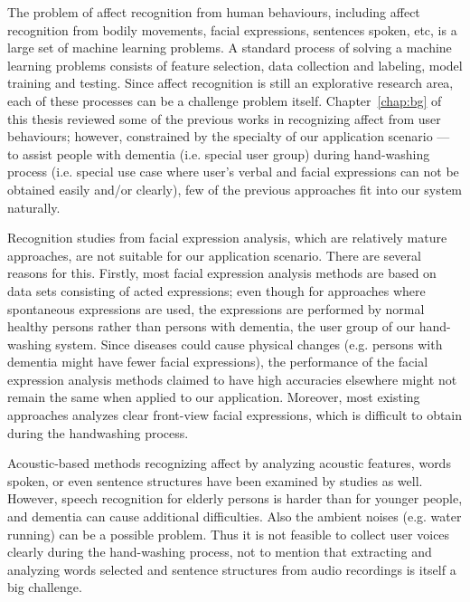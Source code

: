 The problem of affect recognition from human behaviours, including affect recognition from bodily movements, facial expressions, sentences spoken, etc, is a large set of machine learning problems. A standard process of solving a machine learning problems consists of feature selection, data collection and labeling, model training and testing. Since affect recognition is still an explorative research area, each of these processes can be a challenge problem itself. Chapter~\ref{chap:bg} of this thesis reviewed some of the previous works in recognizing affect from user behaviours; however, constrained by the specialty of our application scenario --- to assist people with dementia (i.e. special user group) during hand-washing process (i.e. special use case where user's verbal and facial expressions can not be obtained easily and/or clearly), few of the previous approaches fit into our system naturally.

Recognition studies from facial expression analysis, which are relatively mature approaches, are not suitable for our application scenario. There are several reasons for this. Firstly, most facial expression analysis methods are based on data sets consisting of acted expressions; even though for approaches where spontaneous expressions are used, the expressions are performed by normal healthy persons rather than persons with dementia, the user group of our hand-washing system. Since diseases could cause physical changes (e.g. persons with dementia might have fewer facial expressions), the performance of the facial expression analysis methods claimed to have high accuracies elsewhere might not remain the same when applied to our application. Moreover, most existing approaches analyzes clear front-view facial expressions, which is difficult to obtain during the handwashing process. 

Acoustic-based methods recognizing affect by analyzing acoustic features, words spoken, or even sentence structures have been examined by studies as well. However, speech recognition for elderly persons is harder than for younger people, and dementia can cause additional difficulties. Also the ambient noises (e.g. water running) can be a possible problem. Thus it is not feasible to collect user voices clearly during the hand-washing process, not to mention that extracting and analyzing words selected and sentence structures from audio recordings is itself a big challenge. 

